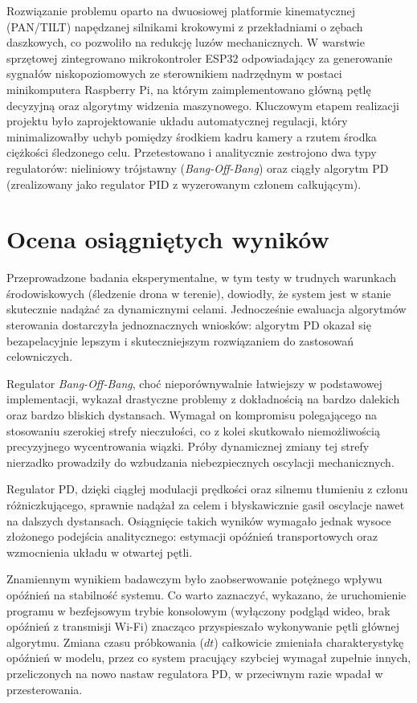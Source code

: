 \documentclass[a4paper,twoside,12pt]{book}
\begin{document}
Rozwiązanie problemu oparto na dwuosiowej platformie kinematycznej (PAN/TILT) napędzanej silnikami krokowymi z przekładniami o zębach daszkowych, co pozwoliło na redukcję luzów mechanicznych. W warstwie sprzętowej zintegrowano mikrokontroler ESP32 odpowiadający za generowanie sygnałów niskopoziomowych ze sterownikiem nadrzędnym w postaci minikomputera Raspberry Pi, na którym zaimplementowano główną pętlę decyzyjną oraz algorytmy widzenia maszynowego. Kluczowym etapem realizacji projektu było zaprojektowanie układu automatycznej regulacji, który minimalizowałby uchyb pomiędzy środkiem kadru kamery a rzutem środka ciężkości śledzonego celu. Przetestowano i analitycznie zestrojono dwa typy regulatorów: nieliniowy trójstawny (\textit{Bang-Off-Bang}) oraz ciągły algorytm PD (zrealizowany jako regulator PID z wyzerowanym członem całkującym).

\section{Ocena osiągniętych wyników}
Przeprowadzone badania eksperymentalne, w tym testy w trudnych warunkach środowiskowych (śledzenie drona w terenie), dowiodły, że system jest w stanie skutecznie nadążać za dynamicznymi celami. Jednocześnie ewaluacja algorytmów sterowania dostarczyła jednoznacznych wniosków: algorytm PD okazał się bezapelacyjnie lepszym i skuteczniejszym rozwiązaniem do zastosowań celowniczych. 

Regulator \textit{Bang-Off-Bang}, choć nieporównywalnie łatwiejszy w podstawowej implementacji, wykazał drastyczne problemy z dokładnością na bardzo dalekich oraz bardzo bliskich dystansach. Wymagał on kompromisu polegającego na stosowaniu szerokiej strefy nieczułości, co z kolei skutkowało niemożliwością precyzyjnego wycentrowania wiązki. Próby dynamicznej zmiany tej strefy nierzadko prowadziły do wzbudzania niebezpiecznych oscylacji mechanicznych. 

Regulator PD, dzięki ciągłej modulacji prędkości oraz silnemu tłumieniu z członu różniczkującego, sprawnie nadążał za celem i błyskawicznie gasił oscylacje nawet na dalszych dystansach. Osiągnięcie takich wyników wymagało jednak wysoce złożonego podejścia analitycznego: estymacji opóźnień transportowych oraz wzmocnienia układu w otwartej pętli. 

Znamiennym wynikiem badawczym było zaobserwowanie potężnego wpływu opóźnień na stabilność systemu. Co warto zaznaczyć, wykazano, że uruchomienie programu w bezfejsowym trybie konsolowym (wyłączony podgląd wideo, brak opóźnień z transmisji Wi-Fi) znacząco przyspieszało wykonywanie pętli głównej algorytmu. Zmiana czasu próbkowania ($dt$) całkowicie zmieniała charakterystykę opóźnień w modelu, przez co system pracujący szybciej wymagał zupełnie innych, przeliczonych na nowo nastaw regulatora PD, w przeciwnym razie wpadał w przesterowania.
\end{document}
